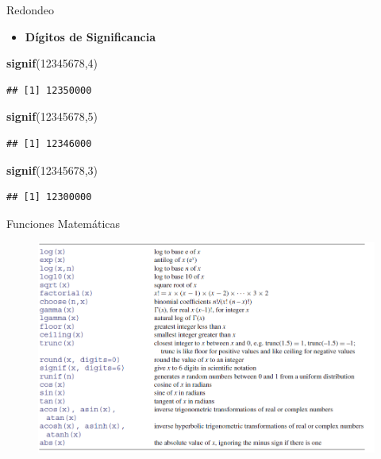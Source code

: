 \documentclass[ignorenonframetext,]{beamer}
\newenvironment{Shaded}{\begin{snugshade}}{\end{snugshade}}
\newcommand{\KeywordTok}[1]{\textcolor[rgb]{0.13,0.29,0.53}{\textbf{#1}}}
\newcommand{\DecValTok}[1]{\textcolor[rgb]{0.00,0.00,0.81}{#1}}
\newcommand{\NormalTok}[1]{#1}
\providecommand{\tightlist}{%
  \setlength{\itemsep}{0pt}\setlength{\parskip}{0pt}}
\begin{document}
\begin{frame}[fragile]{Redondeo}

\begin{itemize}
\tightlist
\item
  \textbf{Dígitos de Significancia}
\end{itemize}

\begin{Shaded}
\begin{Highlighting}[]
\KeywordTok{signif}\NormalTok{(}\DecValTok{12345678}\NormalTok{,}\DecValTok{4}\NormalTok{)}
\end{Highlighting}
\end{Shaded}

\begin{verbatim}
## [1] 12350000
\end{verbatim}

\begin{Shaded}
\begin{Highlighting}[]
\KeywordTok{signif}\NormalTok{(}\DecValTok{12345678}\NormalTok{,}\DecValTok{5}\NormalTok{)}
\end{Highlighting}
\end{Shaded}

\begin{verbatim}
## [1] 12346000
\end{verbatim}

\begin{Shaded}
\begin{Highlighting}[]
\KeywordTok{signif}\NormalTok{(}\DecValTok{12345678}\NormalTok{,}\DecValTok{3}\NormalTok{)}
\end{Highlighting}
\end{Shaded}

\begin{verbatim}
## [1] 12300000
\end{verbatim}

\end{frame}

\begin{frame}{Funciones Matemáticas}

\begin{center}
\begin{figure}
\includegraphics[scale=0.4]{funciones.png}
\end{figure}
\end{center}

\end{frame}
\end{document}
